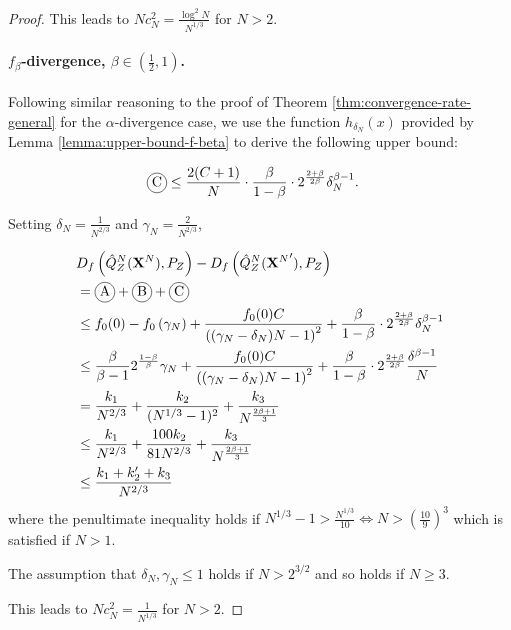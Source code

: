 \begin{proof}
This leads to $Nc_N^2 = \frac{\log^2N}{N^{1/3}}$ for $N>2$.


\paragraph{$f_\beta$-divergence, $\beta\in(\frac{1}{2},1)$.}

Following similar reasoning to the proof of Theorem \ref{thm:convergence-rate-general} for the $\alpha$-divergence case, we use the function $h_{\delta_N}(x)$ provided by Lemma \ref{lemma:upper-bound-f-beta} to derive the following upper bound:


\begin{align*}
    \encircle{C} &\leq \frac{2(C+1)}{N} \cdot \frac{\beta}{1-\beta}\cdot 2^{\frac{2+\beta}{2\beta}}\delta_N^{\beta-1}.
\end{align*}

Setting $\delta_N = \frac{1}{N^{2/3}}$ and $\gamma_N =\frac{2}{N^{2/3}}$,

\begin{align*}
    &D_f\left( \hat{Q}_Z^N(\XN) , P_Z\right) - D_f\left( \hat{Q}_Z^N({\XN}') , P_Z\right) \\
    &= \encircle{A} + \encircle{B} + \encircle{C} \\
    &\leq f_0(0) - f_0\left(\gamma_N\right) + \frac{f_0(0)C}{\left((\gamma_N-\delta_N)N - 1\right)^2} + \frac{\beta}{1-\beta}\cdot 2^{\frac{2+\beta}{2\beta}}\delta_N^{\beta-1} \\
    &\leq \frac{\beta}{\beta-1}2^{\frac{1-\beta}{\beta}}\gamma_N + \frac{f_0(0)C}{\left((\gamma_N-\delta_N)N - 1\right)^2}+ \frac{\beta}{1-\beta}\cdot 2^{\frac{2+\beta}{2\beta}} \frac{ \delta^{\beta-1}}{N} \\
    &= \frac{k_1}{N^{2/3}} + \frac{k_2}{(N^{1/3} - 1)^2} + \frac{k_3}{N^\frac{2\beta + 1}{3}}\\
    &\leq \frac{k_1}{N^{2/3}} + \frac{100k_2}{81N^{2/3}} + \frac{k_3}{N^\frac{2\beta + 1}{3}}\\
    &\leq \frac{k_1+k'_2 + k_3}{N^{2/3}}
\end{align*}
where the penultimate inequality holds if $N^{1/3}-1 > \frac{N^{1/3}}{10} \iff N>\left(\frac{10}{9}\right)^3$ which is satisfied if $N>1$.

The assumption that $\delta_N, \gamma_N \leq 1$ holds if $N>2^{3/2}$ and so holds if $N\geq3$.

This leads to $Nc_N^2 = \frac{1}{N^{1/3}}$ for $N>2$.


\end{proof}

